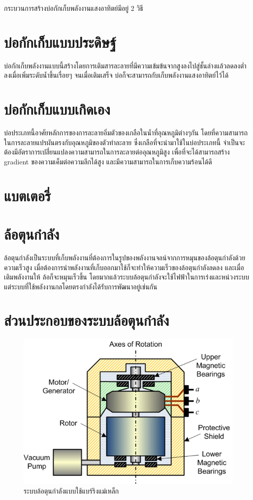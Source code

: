 \documentclass[a4paper,nobib,openany]{tufte-book}
\begin{document}
กระบวนการสร้างบ่อกักเก็บพลังงานแสงอาทิตย์มีอยู่ 2 วิธี

\section{บ่อกักเก็บแบบประดิษฐ์}
\label{sec:orgc8b3143}
บ่อกักเก็บพลังงานแบบนี้สร้างโดยการเติมสารละลายที่มีความเข้มข้นจากสูงลงไปสู่ชั้นล่างแล้วลดลงต่ำลงเมื่อเพิ่มระดับน้ำขึ้นเรื่อยๆ
จนเมื่อเติมเสร็จ บ่อก็จะสามารถกับเก็บพลังงานแสงอาทิตย์ไว้ได้

\section{บ่อกักเก็บแบบเกิดเอง}
\label{sec:org3916559}
บ่อประเภทนี้อาศัยหลักการของการละลายอิ่มตัวของเกลือในน้ำที่อุณหภูมิต่างๆกัน
โดยที่ความสามารถในการละลายแปรผันตรงกับอุณหภูมิของตัวทำละลาย
ซึ่งเกลือที่จะนำมาใช้ในบ่อประเภทนี้
จำเป็นจะต้องมีอัตราการเปลี่่ยนแปลงความสามารถในการละลายต่ออุณหภูมิสูง
เพื่อที่จะได้สามารถสร้าง gradient ของความเค็มต่อความลึกได้สูง
และมีความสามารถในการเก็บความร้อนได้ดี

\section{แบตเตอรี่}
\label{sec:org3de6a0d}
\section{ล้อตุนกำลัง}
\label{sec:org7181394}
ล้อตุนกำลังเป็นระบบที่เก็บพลังงานที่ต้องการในรูปของพลังงานจลน์จากการหมุนของล้อตุนกำลังด้วยความเร็วสูง
เมื่อต้องการนำพลังงานที่เก็บออกมาใช้ก็จะทำให้ความเร็วของล้อตุนกำลังลดลง
และเมื่อเติมพลังงานให้ ล้อก็จะหมุนเร็วขึ้น
โดยมากแล้วระบบล้อตุนกำลังจะใช้ไฟฟ้าในการเร่งและหน่วงระบบ
แต่ระบบที่ใช้พลังงานกลโดยตรงกำลังได้รับการพัฒนาอยู่เช่นกัน

\section{ส่วนประกอบของระบบล้อตุนกำลัง}
\label{sec:orgdabdc9c}
\begin{figure}[htbp]
\centering
\includegraphics[width=.9\linewidth]{./pictures/flywheel-components.png}
\caption{ระบบล้อตุนกำลังแบบใช้แบร์ริงแม่เหล็ก}
\end{figure}
\end{document}

